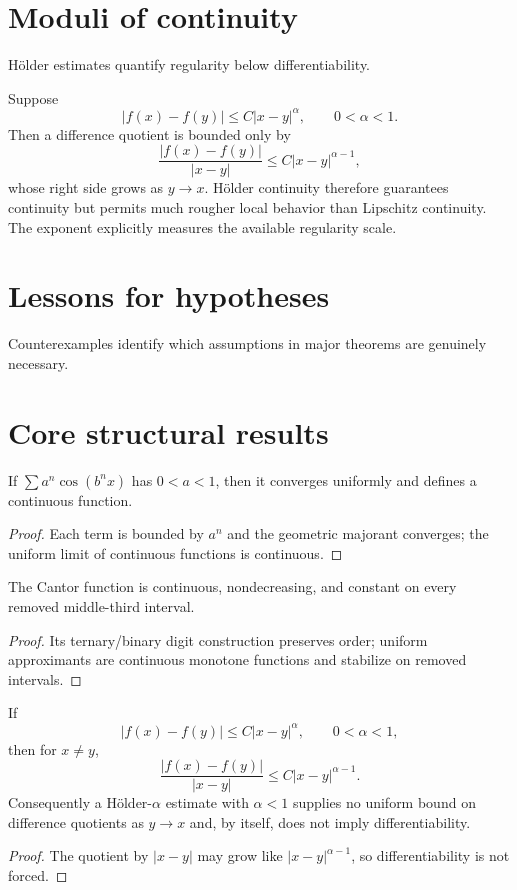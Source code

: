 \section{Moduli of continuity}
Hölder estimates quantify regularity below differentiability.


\begin{example}\label{ex:ii15-expand-03}
Suppose
\[
|f(x)-f(y)|\le C|x-y|^\alpha,\qquad 0<\alpha<1.
\]
Then a difference quotient is bounded only by
\[
\frac{|f(x)-f(y)|}{|x-y|}
\le C|x-y|^{\alpha-1},
\]
whose right side grows as \(y\to x\). Hölder continuity therefore guarantees
continuity but permits much rougher local behavior than Lipschitz continuity.
The exponent explicitly measures the available regularity scale.
\end{example}
\section{Lessons for hypotheses}
Counterexamples identify which assumptions in major theorems are genuinely necessary.

\section{Core structural results}

\begin{theorem}\label{thm:ii15-01}
If $\sum a^n\cos(b^nx)$ has $0<a<1$, then it converges uniformly and defines a continuous function.
\begin{proof}
Each term is bounded by $a^n$ and the geometric majorant converges; the uniform limit of continuous functions is continuous.
\end{proof}
\end{theorem}

\begin{theorem}\label{thm:ii15-02}
The Cantor function is continuous, nondecreasing, and constant on every removed middle-third interval.
\begin{proof}
Its ternary/binary digit construction preserves order; uniform approximants are continuous monotone functions and stabilize on removed intervals.
\end{proof}
\end{theorem}

\begin{theorem}\label{thm:ii15-03}
If
\[
|f(x)-f(y)|\le C|x-y|^\alpha,\qquad 0<\alpha<1,
\]
then for $x\ne y$,
\[
\frac{|f(x)-f(y)|}{|x-y|}\le C|x-y|^{\alpha-1}.
\]
Consequently a Hölder-$\alpha$ estimate with $\alpha<1$ supplies no uniform bound on difference quotients as $y\to x$ and, by itself, does not imply differentiability.
\begin{proof}
The quotient by $|x-y|$ may grow like $|x-y|^{\alpha-1}$, so differentiability is not forced.
\end{proof}
\end{theorem}

